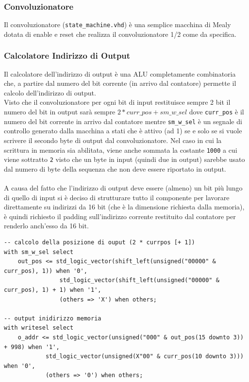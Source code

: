 \documentclass[12pt, a4paper]{article}
\begin{document}
\subsubsection{Convoluzionatore}

Il convoluzionatore (\texttt{state\_machine.vhd}) è una semplice macchina di Mealy dotata di enable e reset che
realizza il convoluzionatore 1/2 come da specifica.

\subsubsection{Calcolatore Indirizzo di Output}

Il calcolatore dell'indirizzo di output è una ALU completamente combinatoria che, a partire
dal numero del bit corrente (in arrivo dal contatore) permette il calcolo dell'indirizzo di output.
\\
\noindent Visto che il convoluzionatore per ogni bit di input restituisce sempre 2 bit il numero del bit in output
sarà sempre $2 * curr\_pos + sm\_w\_sel$ dove \texttt{curr\_pos} è il numero del bit corrente in arrivo dal
contatore mentre \texttt{sm\_w\_sel} è un segnale di controllo generato dalla macchina a stati che è attivo
(ad 1) se e solo se si vuole scrivere il secondo byte di output dal convoluzionatore.
Nel caso in cui la scrittura in memoria sia abilitata, viene anche sommata la costante \texttt{1000} 
a cui viene sottratto \texttt{2} visto che un byte in input (quindi due in output) sarebbe usato dal numero di byte della sequenza 
che non deve essere riportato in output.
\\
\\
A causa del fatto che l'indirizzo di output deve essere (almeno) un bit più lungo di quello
di input si è deciso di strutturare tutto il componente per lavorare direttamente su indirizzi da 16 bit 
(che è la dimensione richiesta dalla memoria), è quindi richiesto il padding sull'indirizzo corrente
restituito dal contatore per renderlo anch'esso da 16 bit.

\begin{verbatim}
-- calcolo della posizione di ouput (2 * currpos [+ 1])                    
with sm_w_sel select
    out_pos <= std_logic_vector(shift_left(unsigned("00000" & curr_pos), 1)) when '0',
                std_logic_vector(shift_left(unsigned("00000" & curr_pos), 1) + 1) when '1',
                (others => 'X') when others;

-- output inidirizzo memoria
with writesel select
    o_addr <= std_logic_vector(unsigned("000" & out_pos(15 downto 3)) + 998) when '1',
            std_logic_vector(unsigned(X"00" & curr_pos(10 downto 3))) when '0',
            (others => '0') when others;  
\end{verbatim}
\end{document}
